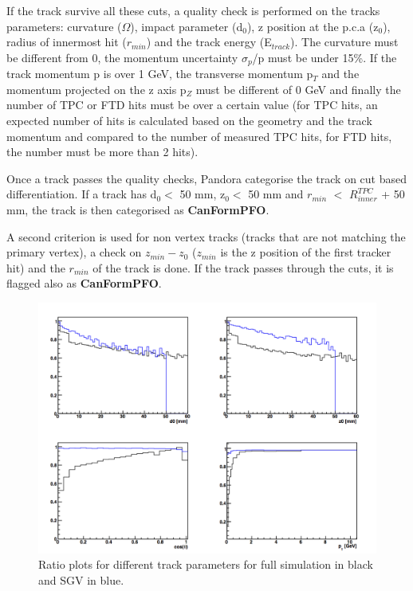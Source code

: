\documentclass[a4paper,12pt]{article}
\begin{document}
If the track survive all these cuts, a quality check is performed on the tracks parameters: curvature ($\Omega$), impact parameter (d$_0$), z position at the p.c.a (z$_0$), radius of innermost hit ($r_{min}$) and the track energy (E$_{track}$). The curvature must be different from 0, the momentum uncertainty $\sigma_p$/p must be under 15\%. If the track momentum p is over 1 GeV, the transverse momentum p$_T$ and the momentum projected on the z axis p$_Z$ must be different of 0 GeV and finally the number of TPC or FTD hits must be over a certain value (for TPC hits, an expected number of hits is calculated based on the geometry and the track momentum and compared to the number of measured TPC hits, for FTD hits, the number must be more than 2 hits).

Once a track passes the quality checks, Pandora categorise the track on cut based differentiation. If a track has  d$_0 <$ 50 mm, z$_0 <$ 50 mm and $r_{min}$  $<$ $R^{TPC}_{inner}$ + 50 mm, the track is then categorised as \textbf{CanFormPFO}. 

A second criterion is used for non vertex tracks (tracks that are not matching the primary vertex), a check on $z_{min} - z_0$ ($z_{min}$ is the z position of the first tracker hit) and the $r_{min}$ of the track is done. If the track passes through the cuts, it is flagged also as \textbf{CanFormPFO}. 

\begin{figure}[!h]
   \centering
    \includegraphics[scale=0.5]{eff_track_selection_curlers.png} 
      \caption{Ratio plots for different track parameters for full simulation in black and SGV in blue.}
   \label{fig:trk_select_wcurlers}
\end{figure}
\end{document}

